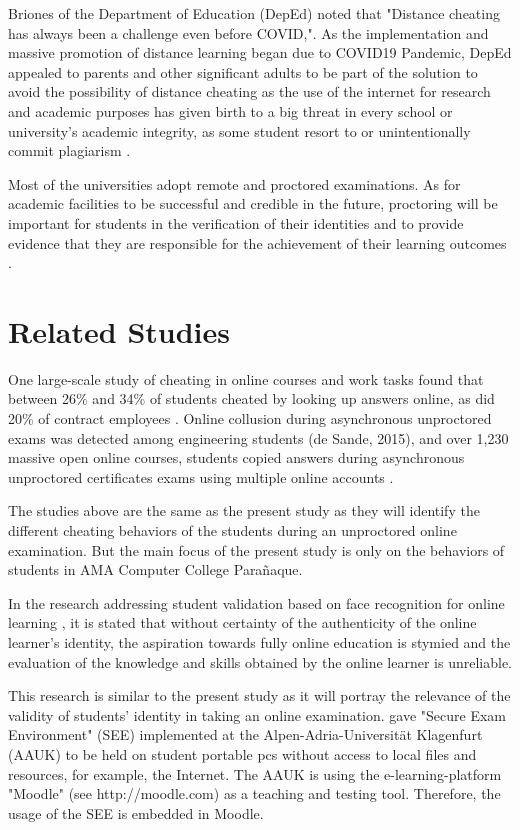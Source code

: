 Briones of the Department of Education (DepEd) noted that "Distance cheating has always been a challenge even before COVID,".
As the implementation and massive promotion of distance learning began due to COVID19 Pandemic, DepEd appealed to parents and other significant adults to be part of the solution to avoid the possibility of distance cheating as the use of the internet for research and academic purposes has given birth to a big threat in every school or university's academic integrity, as some student resort to or unintentionally commit plagiarism \cite{quieta2020plagiarism}.

Most of the universities adopt remote and proctored examinations. As for academic facilities to be successful and credible in the future, proctoring will be important for students in the verification of their identities and to provide evidence that they are responsible for the achievement of their learning outcomes \cite{dela2015massive}.

\section{Related Studies}

One large-scale study of cheating in online courses and work tasks found that between 26\% and 34\% of students cheated by looking up answers online, as did 20\% of contract employees \cite{corrigan2015deterring}.
Online collusion during asynchronous unproctored exams was detected among engineering students (de Sande, 2015), and over 1,230 massive open online courses, students copied answers during asynchronous unproctored certificates exams using multiple online accounts \cite{northcutt2016detecting}.

The studies above are the same as the present study as they will identify the different cheating behaviors of the students during an unproctored online examination.
But the main focus of the present study is only on the behaviors of students in AMA Computer College Parañaque.

In the research addressing student validation based on face recognition for online learning \cite{labayen2014smowl}, it is stated that without certainty of the authenticity of the online learner's identity, the aspiration towards fully online education is stymied and the evaluation of the knowledge and skills obtained by the online learner is unreliable.

This research is similar to the present study as it will portray the relevance of the validity of students' identity in taking an online examination.
 gave "Secure Exam Environment" (SEE) implemented at the Alpen-Adria-Universität Klagenfurt (AAUK) to be held on student portable pcs without access to local files and resources, for example, the Internet.
The AAUK is using the e-learning-platform "Moodle" (see http://moodle.com) as a teaching and testing tool.
Therefore, the usage of the SEE is embedded in Moodle.

